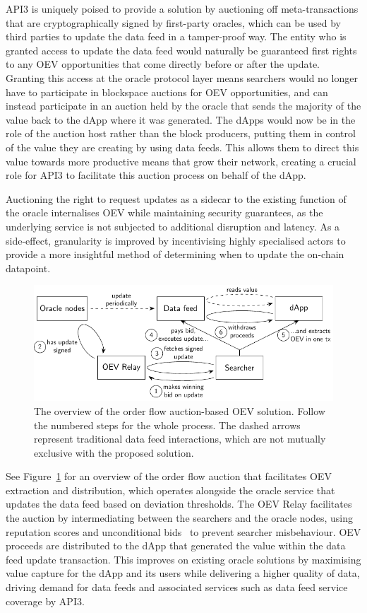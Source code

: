\documentclass[11pt]{article}
\begin{document}
API3 is uniquely poised to provide a solution by auctioning off meta-transactions that are cryptographically signed by first-party oracles, which can be used by third parties to update the data feed in a tamper-proof way.
The entity who is granted access to update the data feed would naturally be guaranteed first rights to any OEV opportunities that come directly before or after the update.
Granting this access at the oracle protocol layer means searchers would no longer have to participate in blockspace auctions for OEV opportunities, and can instead participate in an auction held by the oracle that sends the majority of the value back to the dApp where it was generated.
The dApps would now be in the role of the auction host rather than the block producers, putting them in control of the value they are creating by using data feeds.
This allows them to direct this value towards more productive means that grow their network, creating a crucial role for API3 to facilitate this auction process on behalf of the dApp.

Auctioning the right to request updates as a sidecar to the existing function of the oracle internalises OEV while maintaining security guarantees, as the underlying service is not subjected to additional disruption and latency.
As a side-effect, granularity is improved by incentivising highly specialised actors to provide a more insightful method of determining when to update the on-chain datapoint.

\begin{figure}
	\centering
	\includegraphics{fig/teaser/teaser}
	\caption{The overview of the order flow auction-based OEV solution.
		Follow the numbered steps for the whole process.
		The dashed arrows represent traditional data feed interactions, which are not mutually exclusive with the proposed solution.}
	\label{fig:teaser}
\end{figure}

See Figure~\ref{fig:teaser} for an overview of the order flow auction that facilitates OEV extraction and distribution, which operates alongside the oracle service that updates the data feed based on deviation thresholds.
The OEV Relay facilitates the auction by intermediating between the searchers and the oracle nodes, using reputation scores and unconditional bids~\cite{flashbots-centralization-2} to prevent searcher misbehaviour.
OEV proceeds are distributed to the dApp that generated the value within the data feed update transaction.
This improves on existing oracle solutions by maximising value capture for the dApp and its users while delivering a higher quality of data, driving demand for data feeds and associated services such as data feed service coverage by API3.
\end{document}
